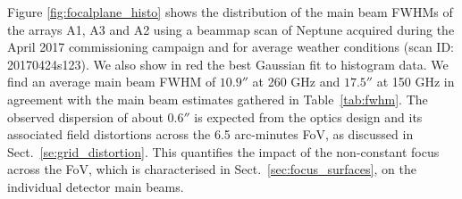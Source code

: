 Figure \ref{fig:focalplane_histo} shows the distribution of the
main beam FWHMs of the arrays A1, A3 and A2 using a beammap
scan of Neptune acquired during the April 2017 commissioning
campaign and for average weather conditions (scan ID: 20170424s123).
We also
show in red the best Gaussian fit to histogram data. We find an
average main beam FWHM of $10.9''$ at 260 GHz and $17.5''$ at
150 GHz in agreement with the main beam estimates gathered in
Table~\ref{tab:fwhm}.
The observed dispersion of about $0.6''$ is expected from the optics design and its associated
field distortions across the 6.5 arc-minutes FoV, as discussed in
Sect.~\ref{se:grid_distortion}. This quantifies the impact of the
non-constant focus across the FoV, which is characterised in
Sect.~\ref{sec:focus_surfaces}, on the individual detector main beams.  





